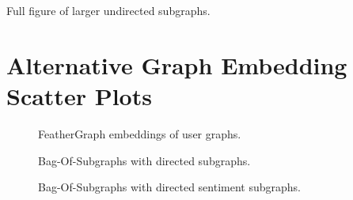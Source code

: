 \begin{sidewaystable}[h]
    \centering
    
    \caption{Full figure of larger undirected subgraphs.}
    \label{fig:large_subgraphs_full}
\end{sidewaystable}


\clearpage
\section{Alternative Graph Embedding Scatter Plots}\label{lab:alt_graph_embs}
\begin{figure}[!h]
    \centering
    \begin{adjustwidth}{-\textwidth}{-\textwidth}
        \centering
        
    \end{adjustwidth}
    \caption{FeatherGraph embeddings of user graphs.}
    \label{fig:feathergraph_embeddings}
\end{figure}

\begin{figure}[!h]
    \centering
    \begin{adjustwidth}{-\textwidth}{-\textwidth}
        \centering
        
    \end{adjustwidth}
    \caption{Bag-Of-Subgraphs with directed subgraphs.}
    \label{fig:directed_subgraph_embeddings}
\end{figure}

\begin{figure}[!h]
    \centering
    \begin{adjustwidth}{-\textwidth}{-\textwidth}
        \centering
        
    \end{adjustwidth}
    \caption{Bag-Of-Subgraphs with directed sentiment subgraphs.}
    \label{fig:directed_sentiment_subgraph_embeddings}
\end{figure}


